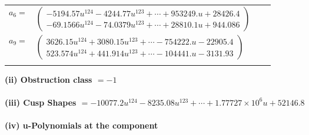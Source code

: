\documentclass[1p]{elsarticle_modified}
\theoremstyle{definition}
\begin{document}
\begin{tabular}{m{7pt} m{180pt} m{7pt} m{180pt} }
\flushright $a_{6}=$&$\begin{pmatrix}-5194.57 u^{124}-4244.77 u^{123}+\cdots+953249. u+28426.4\\-69.1566 u^{124}-74.0379 u^{123}+\cdots+28810.1 u+944.086\end{pmatrix}$ \\
\flushright $a_{9}=$&$\begin{pmatrix}3626.15 u^{124}+3080.15 u^{123}+\cdots-754222. u-22905.4\\523.574 u^{124}+441.914 u^{123}+\cdots-104441. u-3131.93\end{pmatrix}$\\&\end{tabular}
\flushleft \textbf{(ii) Obstruction class $= -1$}\\~\\
\flushleft \textbf{(iii) Cusp Shapes $= -10077.2 u^{124}-8235.08 u^{123}+\cdots+1.77727\times10^{6} u+52146.8$}\\~\\
\newpage\renewcommand{\arraystretch}{1}
\flushleft \textbf{(iv) u-Polynomials at the component}\newline \\
\end{document}
